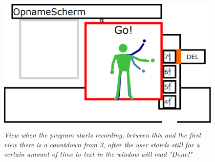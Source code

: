 \begin{figure}[H]
	\begin{center}
		\includegraphics[width=12.5cm, height=7cm]{figures/6_record_start.png}
		\caption{\emph{View when the program starts recording, between this and the first view there is a countdown from 3, after the user stands still for a certain amount of time to text in the window will read "Done!"}}
		\label{The regular view of the end design of the UI}
	\end{center}
\end{figure}

